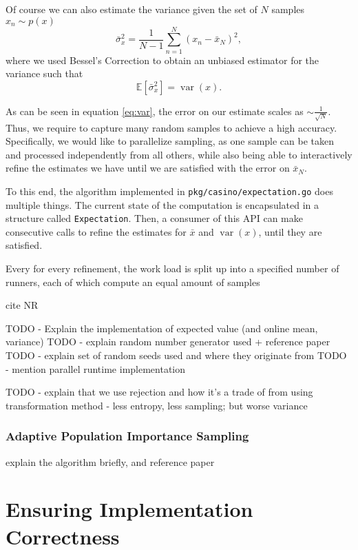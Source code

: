 \documentclass[10pt, a4paper]{article}
\begin{document}
  Of course we can also estimate the variance given the set of $N$ \iid{} samples $x_n \sim p(x)$
  \begin{equation}
  \bar{\sigma}_x^2 = \frac{1}{N-1} \sum_{n=1}^N (x_n - \bar{x}_N)^2,
  \end{equation}
  where we used Bessel's Correction\cite{nr} to obtain an unbiased estimator for the variance such
  that
  \begin{equation}
  \mathbb{E}\left[\bar{\sigma}_x^2\right] = \operatorname{var}(x).
  \end{equation}

  As can be seen in equation \ref{eq:var}, the error on our estimate scales as $\sim \frac{1}{\sqrt{N}}$.
  Thus, we require to capture many random samples to achieve a high accuracy. Specifically, we would
  like to parallelize sampling, as one \iid{} sample can be taken and processed independently from
  all others, while also being able to interactively refine the estimates we have until we are
  satisfied with the error on $\bar{x}_N$.

  To this end, the algorithm implemented in \texttt{pkg/casino/expectation.go} does multiple things.
  The current state of the computation is encapsulated in a structure called \texttt{Expectation}.
  Then, a consumer of this API can make consecutive calls to refine the estimates for $\bar{x}$ and
  $\operatorname{var}(x)$, until they are satisfied.

  Every for every refinement, the work load is split up into a specified number of runners, each of
  which compute an equal amount of \iid{} samples

  cite NR

  TODO - Explain the implementation of expected value (and online mean, variance)
  TODO - explain random number generator used + reference paper
  TODO - explain set of random seeds used and where they originate from
  TODO - mention parallel runtime implementation

  TODO - explain that we use rejection and how it's a trade of from using transformation method
         - less entropy, less sampling; but worse variance 

  \subsubsection{Adaptive Population Importance Sampling}
  explain the \apis{} algorithm briefly, and reference paper

\section{Ensuring Implementation Correctness}
\end{document}
